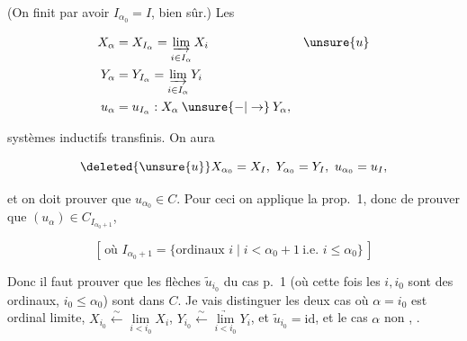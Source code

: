 
(On finit par avoir $I_{\alpha_0}=I$, bien sûr.) Les 

\[
\begin{aligned}
 X_\alpha&=X_{I_\alpha}=\underset{i\in I_\alpha}{\underrightarrow{\lim}}\,X_i
       &&\unsure{u}\\
 Y_\alpha&=Y_{I_\alpha}=\underset{i\in I_\alpha}{\underrightarrow{\lim}}\,Y_i\\
 u_\alpha&=u_{I_\alpha}:X_\alpha\mathbin{\unsure{-|\to}}Y_\alpha,
\end{aligned}
\]

  systèmes inductifs transfinis. On aura

\[
 \deleted{\unsure{u}}X_{\alpha_0}=X_I,\ Y_{\alpha_0}=Y_I,\ u_{\alpha_0}=u_I,
\]

et on doit  prouver que $u_{\alpha_0}\in C$. Pour ceci on applique la prop.~1,    donc de prouver que $(u_\alpha)\in C_{I_{\alpha_0+1}}$,

\[
 [\,\text{où }I_{\alpha_0+1}=\{\text{ordinaux }i\mid i<\alpha_0+1\ \text{i.e. }i\leq\alpha_0\}\,]
\]

 Donc il faut prouver que les flèches $\widetilde u_{i_0}$ du cas p.~1 (où cette fois les $i,i_0$ sont des ordinaux, $i_0\leq\alpha_0$) sont dans $C$. Je vais distinguer les deux cas où $\alpha=i_0$ est ordinal  limite,   $X_{i_0}\xleftarrow{\sim}\underset{i<i_0}{\lim}X_i$, $Y_{i_0}\xleftarrow{\sim}\underset{i<i_0}{\underrightarrow{\lim}}Y_i$, et $\widetilde u_{i_0}=\mathrm{id}$, et le cas $\alpha$ non , .



